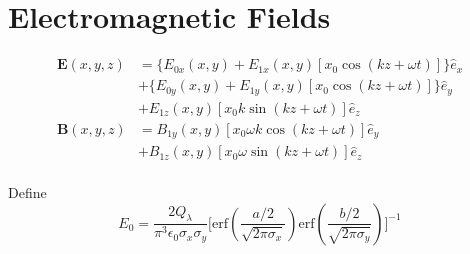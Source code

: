 \documentclass[11pt,oneside]{article}
\begin{document}

\section{Electromagnetic Fields}

\begin{equation}
\begin{split}
  \mathbf{E} (x,y,z)
& = \Big\{ E_{0x}(x,y)
         + E_{1x}(x,y) \left[ x_{0} \cos(k z + \omega t) \right] \Big\}
    \hat{e}_{x} \\
& + \Big\{ E_{0y}(x,y)
         + E_{1y}(x,y) \left[ x_{0} \cos(k z + \omega t) \right] \Big\}
    \hat{e}_{y} \\
& +        E_{1z}(x,y) \left[ x_{0} k \sin(k z + \omega t) \right]
   \hat{e}_{z} \\
  \mathbf{B} (x,y,z)
& =        B_{1y}(x,y) \left[ x_{0} \omega k \cos(k z + \omega t) \right]
   \hat{e}_{y} \\
& +        B_{1z}(x,y) \left[ x_{0} \omega \sin(k z + \omega t) \right]
   \hat{e}_{z} \\
\end{split}
\end{equation}

Define
\begin{equation}
  E_{0}
= \frac{2 Q_{\lambda}}{\pi^{3} \epsilon_{0} \sigma_{x} \sigma_{y}}
  \Bigg[
    \mbox{erf} \left( \frac{a/2}{\sqrt{2 \pi \sigma_{x}}} \right)
    \mbox{erf} \left( \frac{b/2}{\sqrt{2 \pi \sigma_{y}}} \right) 
  \Bigg]^{-1}
\end{equation}
\end{document}
